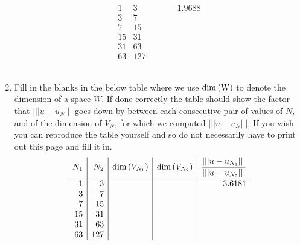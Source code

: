 \begin{enumerate}
\[\begin{array}{r|r|r|r|r}
\\[.75em]
\hline
1 & 3 & \mbox{ } & \mbox{ } & 1.9688
\\
3 & 7 & \mbox{ } & \mbox{ } & \mbox{ }
\\
7 & 15 & \mbox{ } & \mbox{ } & \mbox{ }
\\
15 & 31 & \mbox{ } & \mbox{ } & \mbox{ }
\\
31 & 63 & \mbox{ } & \mbox{ } & \mbox{ }
\\
63 & 127 & \mbox{ }  & \mbox{ } & \mbox{ }
\end{array}
\]
\\
\item Fill in the blanks in the below table where we use $\rm{dim}\left(W\right)$ to denote the dimension of a space $W$. If done correctly the table should show the factor that $\left|\left|\left|u-u_N\right|\right|\right|$ goes down by between each consecutive pair of values of $N$, and of the dimension of $V_N$, for which we computed $\left|\left|\left|u-u_N\right|\right|\right|$. If you wish you can reproduce the table yourself and so do not necessarily have to print out this page and fill it in.
\[
\begin{array}{r|r|r|r|r}
N_1 & N_2 & {\rm dim}\left(V_{N_1}\right) & {\rm dim}\left(V_{N_2}\right) & \displaystyle{{\left|\left|\left|u-u_{N_1}\right|\right|\right| \over \left|\left|\left|u-u_{N_2}\right|\right|\right|}}
\\[.75em]
\hline
1 & 3 & \mbox{ } & \mbox{ } & 3.6181
\\
3 & 7 & \mbox{ } & \mbox{ } & \mbox{ }
\\
7 & 15 & \mbox{ } & \mbox{ } & \mbox{ }
\\
15 & 31 & \mbox{ } & \mbox{ } & \mbox{ }
\\
31 & 63 & \mbox{ } & \mbox{ } & \mbox{ }
\\
63 & 127 & \mbox{ } & \mbox{ } & \mbox{ }
\end{array}
\]
\end{enumerate}




